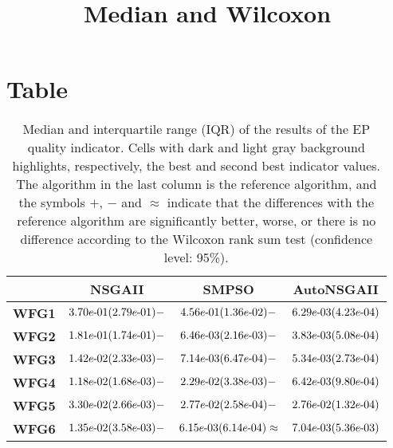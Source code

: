 \documentclass{article}
\title{Median and Wilcoxon}
\author{}
\begin{document}
\maketitle
\section{Table}
\begin{table}[!htp]
  \caption{Median and interquartile range (IQR) of the results of the EP quality indicator. Cells with dark and light gray background highlights, respectively, the best and second best indicator values. The algorithm in the last column is the reference algorithm, and the symbols $+$, $-$ and $\approx$ indicate that the differences with the reference algorithm are significantly better, worse, or there is no difference according to the Wilcoxon rank sum test (confidence level: 95\%).}
  \label{table:EP}
  \centering
  \begin{tiny}
  \begin{tabular}{c|ccc}
      & \textbf{NSGAII} & \textbf{SMPSO} & \textbf{AutoNSGAII} \\\hline
\textbf{WFG1} & $\cellcolor{gray25} {3.70e\makebox[0.1cm]{-}01(2.79e\makebox[0.1cm]{-}01)-} $ & $ {4.56e\makebox[0.1cm]{-}01(1.36e\makebox[0.1cm]{-}02)-} $ & $ \cellcolor{gray95} 6.29e\makebox[0.1cm]{-}03(4.23e\makebox[0.1cm]{-}04)$ \\
\textbf{WFG2} & ${1.81e\makebox[0.1cm]{-}01(1.74e\makebox[0.1cm]{-}01)-} $ & $ \cellcolor{gray25} {6.46e\makebox[0.1cm]{-}03(2.16e\makebox[0.1cm]{-}03)-} $ & $ \cellcolor{gray95} 3.83e\makebox[0.1cm]{-}03(5.08e\makebox[0.1cm]{-}04)$ \\
\textbf{WFG3} & ${1.42e\makebox[0.1cm]{-}02(2.33e\makebox[0.1cm]{-}03)-} $ & $ \cellcolor{gray25} {7.14e\makebox[0.1cm]{-}03(6.47e\makebox[0.1cm]{-}04)-} $ & $ \cellcolor{gray95} 5.34e\makebox[0.1cm]{-}03(2.73e\makebox[0.1cm]{-}04)$ \\
\textbf{WFG4} & $\cellcolor{gray25} {1.18e\makebox[0.1cm]{-}02(1.68e\makebox[0.1cm]{-}03)-} $ & $ {2.29e\makebox[0.1cm]{-}02(3.38e\makebox[0.1cm]{-}03)-} $ & $ \cellcolor{gray95} 6.42e\makebox[0.1cm]{-}03(9.80e\makebox[0.1cm]{-}04)$ \\
\textbf{WFG5} & ${3.30e\makebox[0.1cm]{-}02(2.66e\makebox[0.1cm]{-}03)-} $ & $ \cellcolor{gray25} {2.77e\makebox[0.1cm]{-}02(2.58e\makebox[0.1cm]{-}04)-} $ & $ \cellcolor{gray95} 2.76e\makebox[0.1cm]{-}02(1.32e\makebox[0.1cm]{-}04)$ \\
\textbf{WFG6} & ${1.35e\makebox[0.1cm]{-}02(3.58e\makebox[0.1cm]{-}03)-} $ & $ \cellcolor{gray95} {6.15e\makebox[0.1cm]{-}03(6.14e\makebox[0.1cm]{-}04)\approx} $ & $ \cellcolor{gray25} 7.04e\makebox[0.1cm]{-}03(5.36e\makebox[0.1cm]{-}03)$ \\

\end{tabular}
\end{tiny}
\end{table}
\end{document}
